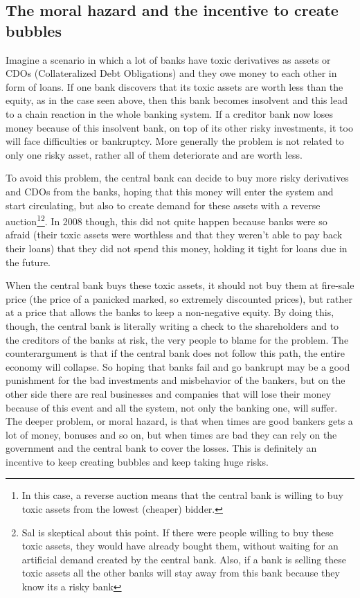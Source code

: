 \subsection{The moral hazard and the incentive to create bubbles}
Imagine a scenario in which a lot of banks have toxic derivatives as assets or CDOs (Collateralized Debt Obligations) and they owe money to each other in form of loans. If one bank discovers that its toxic assets are worth less than the equity, as in the case seen above, then this bank becomes insolvent and this lead to a chain reaction in the whole banking system. If a creditor bank now loses money because of this insolvent bank, on top of its other risky investments, it too will face difficulties or bankruptcy. More generally the problem is not related to only one risky asset, rather all of them deteriorate and are worth less.

To avoid this problem, the central bank can decide to buy more risky derivatives and CDOs from the banks, hoping that this money will enter the system and start circulating, but also to create demand for these assets with a reverse auction\footnote{In this case, a reverse auction means that the central bank is willing to buy toxic assets from the lowest (cheaper) bidder.}\footnote{Sal is skeptical about this point. If there were people willing to buy these toxic assets, they would have already bought them, without waiting for an artificial demand created by the central bank. Also, if a bank is selling these toxic assets all the other banks will stay away from this bank because they know its a risky bank}. In 2008 though, this did not quite happen because banks were so afraid (their toxic assets were worthless and that they weren't able to pay back their loans) that they did not spend this money, holding it tight for loans due in the future.

When the central bank buys these toxic assets, it should not buy them at fire-sale price (the price of a panicked marked, so extremely discounted prices), but rather at a price that allows the banks to keep a non-negative equity. By doing this, though, the central bank is literally writing a check to the shareholders and to the creditors of the banks at risk, the very people to blame for the problem. The counterargument is that if the central bank does not follow this path, the entire economy will collapse. So hoping that banks fail and go bankrupt may be a good punishment for the bad investments and misbehavior of the bankers, but on the other side there are real businesses and companies that will lose their money because of this event and all the system, not only the banking one, will suffer. 
The deeper problem, or moral hazard, is that when times are good bankers gets a lot of money, bonuses and so on, but when times are bad they can rely on the government and the central bank to cover the losses. This is definitely an incentive to keep creating bubbles and keep taking huge risks.

